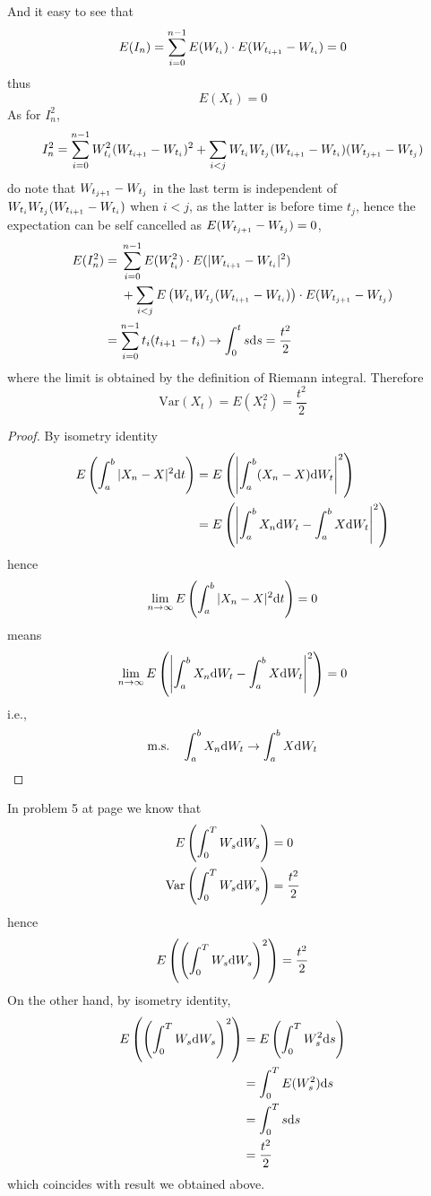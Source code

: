 \documentclass{homework}
\newcommand{\var}{\mathrm{Var}}
\begin{document}
    And it easy to see that
    \[E(I_n)=\sum_{i=0}^{n-1} E(W_{t_i})\cdot E(W_{t_{i+1}}-W_{t_i})=0\]
    thus
    \[E(X_t)=0\]
    As for $I_n^2$,
    \[I_n^2=\sum_{i=0}^{n-1}W_{t_i}^2(W_{t_{i+1}}-W_{t_i})^2
    +\sum_{i<j}W_{t_i}W_{t_j}(W_{t_{i+1}}-W_{t_i})(W_{t_{j+1}}-W_{t_j})\]
    do note that $W_{t_{j+1}}-W_{t_j}$ in the last term is independent
    of $W_{t_i}W_{t_j}(W_{t_{i+1}}-W_{t_i})$ when $i<j$, as the latter is before
    time $t_j$, hence the expectation can be self cancelled
    as $E(W_{t_{j+1}}-W_{t_j})=0$,
    \[\begin{aligned}
        E(I_n^2)
        &=\begin{aligned}[t]
         &\sum_{i=0}^{n-1} E(W_{t_i}^2)\cdot E(|W_{t_{i+1}}-W_{t_i}|^2)\\
         &+\sum_{i<j}E\left(W_{t_i}W_{t_j}(W_{t_{i+1}}-W_{t_i})\right)\cdot E(W_{t_{j+1}}-W_{t_j})
         \end{aligned}\\
        &=\sum_{i=0}^{n-1} t_i(t_{i+1}-t_i)
        \to\int_0^ts\mathrm d s=\frac{t^2}{2}
    \end{aligned}\]
    where the limit is obtained by the definition of Riemann integral.
    Therefore
    \[\var(X_t)=E(X_t^2)=\frac{t^2}{2}\]

    \problem

    \problem

    \problem
    \begin{proof}
        By isometry identity
        \[\begin{aligned}
            E\left(\int_a^b|X_n-X|^2\mathrm d t\right)
            &=E\left(\left|\int_a^b(X_n-X)\mathrm d W_t\right|^2\right)\\
            &=E\left(\left|
            \int_a^bX_n\mathrm d W_t-\int_a^bX\mathrm d W_t
            \right|^2\right)
        \end{aligned}\]
        hence
        \[\lim_{n\to\infty}E\left(
            \int_a^b|X_n-X|^2\mathrm d t\right)=0\]
        means
        \[\lim_{n\to\infty}E\left(\left|
            \int_a^bX_n\mathrm d W_t-\int_a^bX\mathrm d W_t
            \right|^2\right)=0\]
        i.e.,
        \[\text{m.s.}\quad
        \int_a^bX_n\mathrm d W_t\to\int_a^bX\mathrm d W_t\]
    \end{proof}

    \problem
    In problem 5 at page \pageref{var and e} we know that
    \[\begin{aligned}
        E\left(\int_0^TW_s\diff W_s\right)&=0\\
        \var\left(\int_0^TW_s\diff W_s\right)&=\frac{t^2}{2}
    \end{aligned}\]
    hence
    \[E\left(\left(\int_0^TW_s\mathrm d W_s\right)^2\right)=\frac{t^2}{2}\]
    On the other hand, by isometry identity,
    \[\begin{aligned}
        E\left(\left(\int_0^TW_s\mathrm d W_s\right)^2\right)
        &=E\left(\int_0^TW_s^2\mathrm d s\right)\\
        &=\int_0^TE(W_s^2)\mathrm d s\\
        &=\int_0^Ts\mathrm d s\\
        &=\frac{t^2}{2}
    \end{aligned}\]
    which coincides with result we obtained above.
\end{document}
